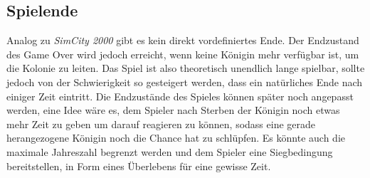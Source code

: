 \subsection{Spielende}
Analog zu \textit{SimCity 2000} gibt es kein direkt vordefiniertes Ende. Der Endzustand des Game Over wird jedoch erreicht, wenn keine Königin mehr verfügbar ist, um die Kolonie zu leiten. Das Spiel ist also theoretisch unendlich lange spielbar, sollte jedoch von der Schwierigkeit so gesteigert werden, dass ein natürliches Ende nach einiger Zeit eintritt. Die Endzustände des Spieles können später noch angepasst werden, eine Idee wäre es, dem Spieler nach Sterben der Königin noch etwas mehr Zeit zu geben um darauf reagieren zu können, sodass eine gerade herangezogene Königin noch die Chance hat zu schlüpfen. Es könnte auch die maximale Jahreszahl begrenzt werden und dem Spieler eine Siegbedingung bereitstellen, in Form eines Überlebens für eine gewisse Zeit.
